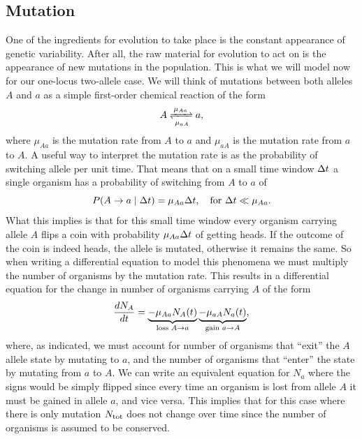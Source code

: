 \subsection{Mutation}\label{seq_determ_mut}

One of the ingredients for evolution to take place is the constant appearance
of genetic variability. After all, the raw material for evolution to act on is
the appearance of new mutations in the population. This is what we will model
now for our one-locus two-allele case. We will think of mutations between both
alleles $A$ and $a$ as a simple first-order chemical reaction of the form
\begin{equation}
  A \xrightleftharpoons[\mu_{a A}]
  {\,\mu_{A a}\,} a,
\end{equation}
where $\mu_{A a}$ is the mutation rate from $A$ to $a$ and 
$\mu_{a A}$ is the mutation rate from $a$ to $A$. A useful way to
interpret the mutation rate is as the probability of switching allele per unit
time. That means that on a small time window $\Delta t$ a single organism has a
probability of switching from $A$ to $a$ of
\begin{equation}
  P(A \rightarrow a \mid \Delta t) = \mu_{A a} \Delta t, \quad 
  \text{for } \Delta t \ll \mu_{Aa}.
\end{equation}
What this implies is that for this small time window every organism carrying
allele $A$ flips a coin with probability $\mu_{A a} \Delta t$ of getting
heads. If the outcome of the coin is indeed heads, the allele is mutated,
otherwise it remains the same. So when writing a differential equation to model
this phenomena we must multiply the number of organisms by the mutation rate.
This results in a differential equation for the change in number of organisms
carrying $A$ of the form
\begin{equation}
  {d{N_A} \over dt} = 
  \underbrace{- \mu_{A a} N_A(t)}_{\text{loss } A \rightarrow a}
  \underbrace{- \mu_{a A} N_a(t)}_{\text{gain } a \rightarrow A},
\end{equation}
where, as indicated, we must account for number of organisms that ``exit'' the
$A$ allele state by mutating to $a$, and the number of organisms that ``enter''
the state by mutating from $a$ to $A$. We can write an equivalent equation for
$N_a$ where the signs would be simply flipped since every time an organism is
lost from allele $A$ it must be gained in allele $a$, and vice versa. This
implies that for this case where there is only mutation $N_{\text{tot}}$ does not change
over time since the number of organisms is assumed to be conserved.

